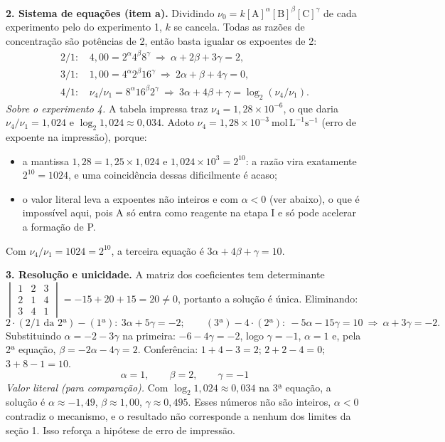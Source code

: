\documentclass{article}%
\begin{document}
\textbf{2. Sistema de equações (item a).} Dividindo $\nu_0=k[\mathrm{A}]^{\alpha}[\mathrm{B}]^{\beta}[\mathrm{C}]^{\gamma}$ de cada experimento pelo do experimento 1, $k$ se cancela. Todas as razões de concentração são potências de 2, então basta igualar os expoentes de 2:
\begin{align*}
\text{2/1: }& 4{,}00=2^{\alpha}4^{\beta}8^{\gamma}\ \Rightarrow\ \alpha+2\beta+3\gamma=2,\\
\text{3/1: }& 1{,}00=4^{\alpha}2^{\beta}16^{\gamma}\ \Rightarrow\ 2\alpha+\beta+4\gamma=0,\\
\text{4/1: }& \nu_4/\nu_1=8^{\alpha}16^{\beta}2^{\gamma}\ \Rightarrow\ 3\alpha+4\beta+\gamma=\log_2(\nu_4/\nu_1).
\end{align*}
\emph{Sobre o experimento 4.} A tabela impressa traz $\nu_4=1{,}28\times10^{-6}$, o que daria $\nu_4/\nu_1=1{,}024$ e $\log_2 1{,}024\approx0{,}034$. Adoto $\nu_4=1{,}28\times10^{-3}\ \mathrm{mol\,L^{-1}s^{-1}}$ (erro de expoente na impressão), porque:
\begin{itemize}
\item a mantissa $1{,}28=1{,}25\times1{,}024$ e $1{,}024\times10^{3}=2^{10}$: a razão vira exatamente $2^{10}=1024$, e uma coincidência dessas dificilmente é acaso;
\item o valor literal leva a expoentes não inteiros e com $\alpha<0$ (ver abaixo), o que é impossível aqui, pois A só entra como reagente na etapa I e só pode acelerar a formação de P.
\end{itemize}
Com $\nu_4/\nu_1=1024=2^{10}$, a terceira equação é $3\alpha+4\beta+\gamma=10$.

\textbf{3. Resolução e unicidade.} A matriz dos coeficientes tem determinante
$\begin{vmatrix}1&2&3\\2&1&4\\3&4&1\end{vmatrix}=-15+20+15=20\neq0$, portanto a solução é única. Eliminando:
\[
2\cdot(\text{2/1 da 2ª})-(\text{1ª}):\ 3\alpha+5\gamma=-2;\qquad
(\text{3ª})-4\cdot(\text{2ª}):\ -5\alpha-15\gamma=10\ \Rightarrow\ \alpha+3\gamma=-2 .
\]
Substituindo $\alpha=-2-3\gamma$ na primeira: $-6-4\gamma=-2$, logo $\gamma=-1$, $\alpha=1$ e, pela 2ª equação, $\beta=-2\alpha-4\gamma=2$. Conferência: $1+4-3=2$; $2+2-4=0$; $3+8-1=10$.
\[
\boxed{\alpha=1,\qquad\beta=2,\qquad\gamma=-1}
\]
\emph{Valor literal (para comparação).} Com $\log_2 1{,}024\approx0{,}034$ na 3ª equação, a solução é $\alpha\approx-1{,}49$, $\beta\approx1{,}00$, $\gamma\approx0{,}495$. Esses números não são inteiros, $\alpha<0$ contradiz o mecanismo, e o resultado não corresponde a nenhum dos limites da seção 1. Isso reforça a hipótese de erro de impressão.
\end{document}
